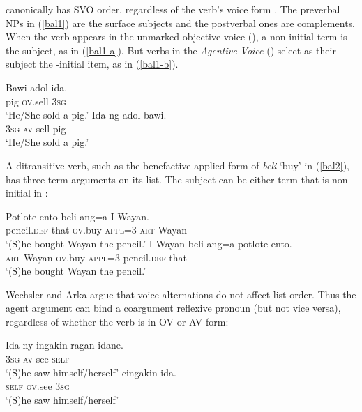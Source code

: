 \documentclass[output=paper
 	        ,biblatex
                ,babelshorthands
                ,newtxmath
                ,draftmode
                ,colorlinks, citecolor=brown
]{langscibook}
\begin{document}
 canonically has SVO order, regardless of the verb's voice form
\citep{Artawa1994, Wechsler+Arka:1998}.  The preverbal NPs in (\ref{bal1}) are the surface subjects
and the postverbal ones are complements.  When the verb appears in the unmarked objective voice
(), a non-initial term is the subject, as in (\ref{bal1-a}).  But verbs in the
\emph{Agentive Voice} () select as their subject the \argst{}-initial
item, as in (\ref{bal1-b}).

\begin{exe}
	\ex\label{bal1}
\begin{xlist}
\ex \label{bal1-a}	
\gll Bawi adol ida.  \\
     pig \textsc{ov}.sell \textsc{3sg}   \\
\glt `He/She sold a pig.'
\ex\label{bal1-b}
\gll Ida ng-adol bawi.  \\
     \textsc{3sg} \textsc{av}-sell pig   \\
\glt `He/She sold a pig.'
\end{xlist}
\end{exe} 

\noindent
A ditransitive verb, such as the benefactive applied form of \textit{beli} `buy' in
(\ref{bal2}), has three term arguments on its \argst list.  The subject can be either term that is
non-initial in \argst{}:

\eal
\label{bal2}
\ex
\gll Potlote             ento beli-ang=a                      I            Wayan.  \\
     pencil.\textsc{def} that \textsc{ov}.buy-\textsc{appl}=3 \textsc{art} Wayan   \\
\glt `(S)he bought Wayan the pencil.'
\ex
\gll I            Wayan beli-ang=a                      potlote             ento.   \\
     \textsc{art} Wayan \textsc{ov}.buy-\textsc{appl}=3 pencil.\textsc{def} that   \\
\glt `(S)he bought Wayan the pencil.'
\zl

\noindent
Wechsler and Arka argue that  voice alternations do not affect \argst
list order.  Thus the agent argument can bind a coargument reflexive pronoun (but not vice versa),
regardless of whether the verb is in OV or AV form:

\eal
\label{bal3}
\ex
\gll Ida          ny-ingakin      ragan idane. \\
     \textsc{3sg} \textsc{av}-see \textsc{self}\\
\glt ‘(S)he saw himself/herself’
\ex
{} cingakin        ida. \\
     \textsc{self} \textsc{ov}.see \textsc{3sg} \\
\glt ‘(S)he saw himself/herself’
\zl
\end{document}
